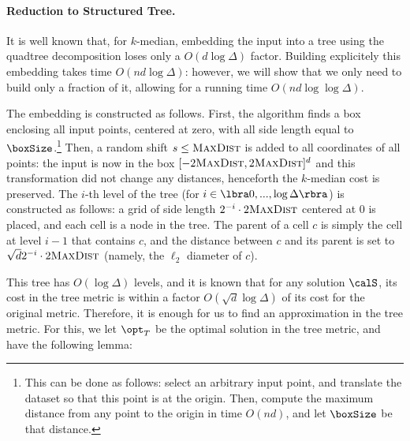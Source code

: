 \paragraph{Reduction to Structured Tree.}
\newcommand{\boxsize}{\textsc{MaxDist}}
It is well known that, for $k$-median, embedding the input into a tree using the quadtree decomposition loses only a $O(d \log \Delta)$ factor. Building explicitely this embedding takes time $O(nd \log \Delta)$: however, we will show that we only need to build only a fraction of it, allowing for a running time $O(nd \log \log \Delta)$. 

The embedding is constructed as follows. First, the algorithm finds a box enclosing all input points, centered at zero, with all side length equal to $\boxSize$.\footnote{This can be done as follows: select an arbitrary input point, and translate the dataset so that this point is at the origin. Then, compute the maximum distance from any point to the origin in time $O(nd)$, and let $\boxSize$ be that distance.} Then, a random shift $s \leq \boxsize$ is added to all coordinates of all points: the input is now in the box $[-2\boxsize, 2\boxsize]^d$ and this transformation did not change any distances, henceforth the $k$-median cost is preserved. 
The $i$-th level of the tree (for $i \in \lbra 0, ..., \log \Delta \rbra$) is constructed as follows: a grid of side length $2^{-i} \cdot 2\boxsize$ centered at $0$ is placed, and each cell is a node in the tree.
 The parent of a cell $c$ is simply the cell at level $i-1$ that contains $c$, and the distance between $c$ and its parent is set to $\sqrt{d}2^{-i} \cdot 2\boxsize$ (namely, the $\ell_2$ diameter of $c$).
 
 This tree has $O(\log \Delta)$ levels, and it is known that for any solution $\calS$, its cost in the tree metric is within a factor $O(\sqrt d \log \Delta)$ of its cost for the original metric. Therefore, it is enough for us to find an approximation in the tree metric. For this, we let $\opt_T$ be the optimal solution in the tree metric, and have the following lemma:
 
